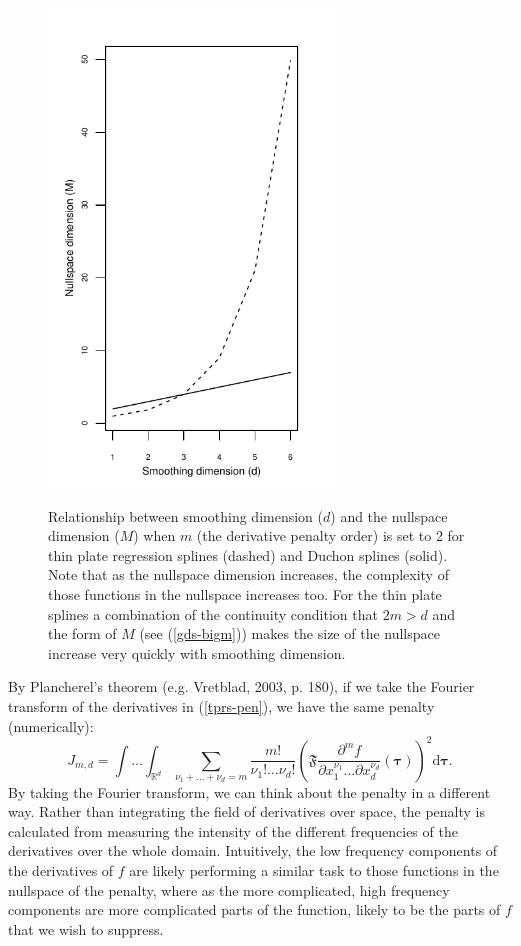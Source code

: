 \documentclass[useAMS, referee]{biom}
\begin{document}
\begin{figure}
\centering
\includegraphics[width=3in]{figs/nullspace-dim.pdf} \\
\caption{Relationship between smoothing dimension ($d$) and the nullspace dimension ($M$) when $m$ (the derivative penalty order) is set to 2 for thin plate regression splines (dashed) and Duchon splines (solid). Note that as the nullspace dimension increases, the complexity of those functions in the nullspace increases too. For the thin plate splines a combination of the continuity condition that $2m>d$ and the form of $M$ (see (\ref{gds-bigm})) makes the size of the nullspace increase very quickly with smoothing dimension.}
\label{nullspace-dim}
\end{figure}


By Plancherel's theorem (e.g. Vretblad, 2003, p. 180), if we take the Fourier transform of the derivatives in (\ref{tprs-pen}), we have the same penalty (numerically):
\begin{equation}
J_{m,d} = \int \ldots \int_{\mathbb{R}^d} \sum_{\nu_1 + \dots + \nu_d=m} \frac{m!}{\nu_1! \dots \nu_d!} \left ( \mathfrak{F} \frac{\partial^m f}{\partial x_1^{\nu_1} \ldots  \partial x_d^{\nu_d}} \left (  \boldsymbol{\tau}\right ) \right )^2 \text{d} \boldsymbol{\tau}.
\label{tprs-pen-ft}
\end{equation}
By taking the Fourier transform, we can think about the penalty in a different way. Rather than integrating the field of derivatives over space, the penalty is calculated from measuring the intensity of the different frequencies of the derivatives over the whole domain. Intuitively, the low frequency components of the derivatives of $f$ are likely performing a similar task to those functions in the nullspace of the penalty, where as the more complicated, high frequency components are more complicated parts of the function, likely to be the parts of $f$ that we wish to suppress. 
\end{document}
